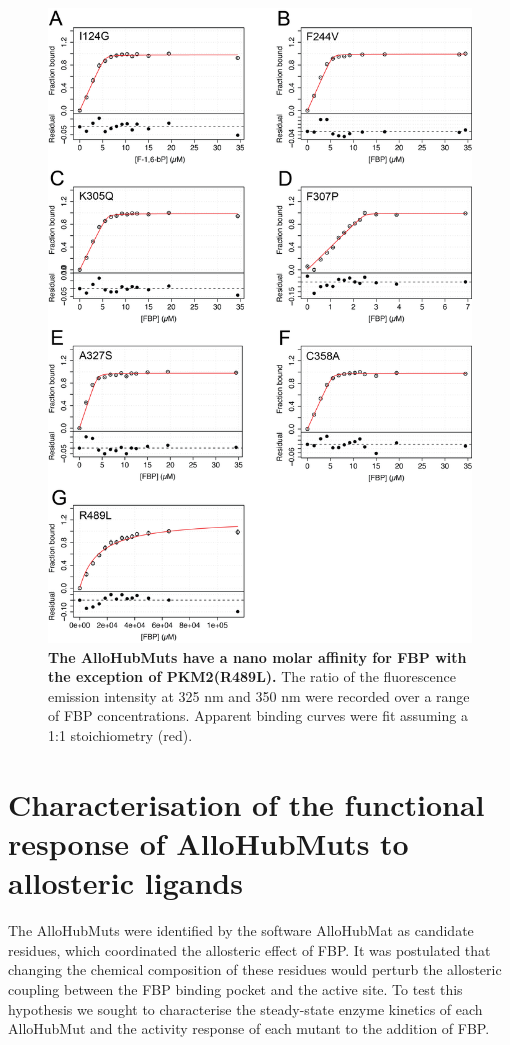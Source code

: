 \begin{figure}[!ht]
\includegraphics[scale=0.65]{ch7_fig5_fbp_binding.png}
\caption[The AlloHubMuts have a nano molar affinity for FBP with the exception of PKM2(R489L).] {\textbf{The AlloHubMuts have a nano molar affinity for FBP with the exception of PKM2(R489L).} The ratio of the fluorescence emission intensity at 325 nm and 350 nm were recorded over a range of FBP concentrations. Apparent binding curves were fit assuming a 1:1 stoichiometry (red). }
\label{fig:fbp_binding_allohubmuts}
\end{figure}
%
%
\clearpage


\section{Characterisation of the functional response of AlloHubMuts to allosteric ligands}
The AlloHubMuts were identified by the software AlloHubMat as candidate residues, which coordinated the allosteric effect of FBP. It was postulated that changing the chemical composition of these residues would perturb the allosteric coupling between the FBP binding pocket and the active site. To test this hypothesis we sought to characterise the steady-state enzyme kinetics of each AlloHubMut and the activity response of each mutant to the addition of FBP. 

